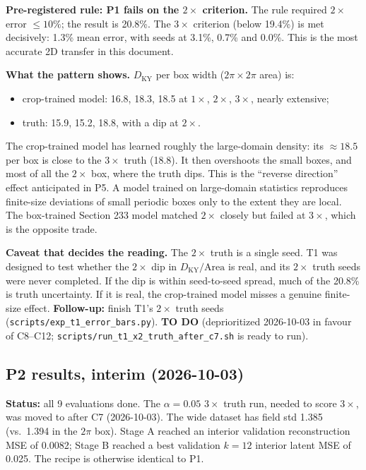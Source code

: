 \documentclass[11pt]{article}
\begin{document}
\textbf{Pre-registered rule: P1 fails on the $2\times$ criterion.} The
rule required $2\times$ error $\le10\%$; the result is 20.8\%. The $3\times$
criterion (below 19.4\%) is met decisively: 1.3\% mean error, with seeds at 3.1\%, 0.7\% and 0.0\%. This is the most accurate 2D transfer in this document.

\textbf{What the pattern shows.} $D_{\mathrm{KY}}$ per box width
($2\pi\times2\pi$ area) is:
\begin{itemize}[leftmargin=*]
\item crop-trained model: 16.8, 18.3, 18.5 at $1\times$, $2\times$,
  $3\times$, nearly extensive;
\item truth: 15.9, 15.2, 18.8, with a dip at $2\times$.
\end{itemize}
The crop-trained model has learned roughly the large-domain density: its
$\approx18.5$ per box is close to the $3\times$ truth (18.8). It then
overshoots the small boxes, and most of all the $2\times$ box, where the
truth dips. This is the ``reverse direction'' effect anticipated in P5.
A model trained on large-domain statistics reproduces finite-size
deviations of small periodic boxes only to the extent they are local. The
box-trained Section 233 model matched $2\times$ closely but failed at
$3\times$, which is the opposite trade.

\textbf{Caveat that decides the reading.} The $2\times$ truth is a single
seed. T1 was designed to test whether the $2\times$ dip in
$D_{\mathrm{KY}}/\mathrm{Area}$ is real, and its $2\times$ truth seeds were
never completed. If the dip is within seed-to-seed spread, much of the
20.8\% is truth uncertainty. If it is real, the crop-trained model
misses a genuine finite-size effect. \textbf{Follow-up:} finish T1's
$2\times$ truth seeds (\texttt{scripts/exp\_t1\_error\_bars.py}). \textbf{TO DO} (deprioritized 2026-10-03 in favour of C8--C12; \texttt{scripts/run\_t1\_x2\_truth\_after\_c7.sh} is ready to run).

\subsection{P2 results, interim (2026-10-03)}
\label{sec:p2_results}

\textbf{Status:} all 9 evaluations done. The $\alpha{=}0.05$ $3\times$ truth run, needed to score $3\times$, was moved to after C7 (2026-10-03). The
wide dataset has field std 1.385 (vs.\ 1.394 in the $2\pi$ box). Stage A
reached an interior validation reconstruction MSE of 0.0082; Stage B
reached a best validation $k{=}12$ interior latent MSE of 0.025. The
recipe is otherwise identical to P1.
\end{document}
